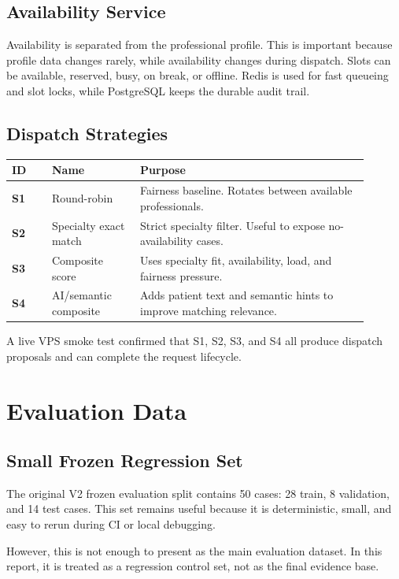 \documentclass[11pt,a4paper]{article}
\begin{document}
\subsection{Availability Service}

Availability is separated from the professional profile. This is important because profile data changes rarely, while availability changes during dispatch. Slots can be available, reserved, busy, on break, or offline. Redis is used for fast queueing and slot locks, while PostgreSQL keeps the durable audit trail.

\subsection{Dispatch Strategies}

\begin{longtable}{>{\bfseries}p{0.10\linewidth}p{0.22\linewidth}p{0.58\linewidth}}
\toprule
ID & Name & Purpose \\
\midrule
S1 & Round-robin & Fairness baseline. Rotates between available professionals. \\
S2 & Specialty exact match & Strict specialty filter. Useful to expose no-availability cases. \\
S3 & Composite score & Uses specialty fit, availability, load, and fairness pressure. \\
S4 & AI/semantic composite & Adds patient text and semantic hints to improve matching relevance. \\
\bottomrule
\end{longtable}

A live VPS smoke test confirmed that S1, S2, S3, and S4 all produce dispatch proposals and can complete the request lifecycle.

\section{Evaluation Data}

\subsection{Small Frozen Regression Set}

The original V2 frozen evaluation split contains 50 cases: 28 train, 8 validation, and 14 test cases. This set remains useful because it is deterministic, small, and easy to rerun during CI or local debugging.

However, this is not enough to present as the main evaluation dataset. In this report, it is treated as a regression control set, not as the final evidence base.
\end{document}
